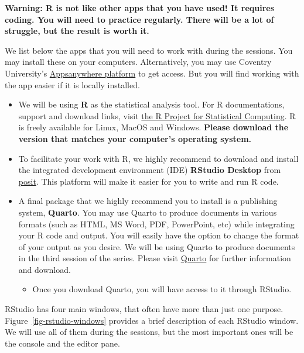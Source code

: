 \documentclass[
  letterpaper,
  DIV=11,
  numbers=noendperiod]{scrreprt}
\providecommand{\tightlist}{%
  \setlength{\itemsep}{0pt}\setlength{\parskip}{0pt}}\usepackage{longtable,booktabs,array}
\begin{document}
\textbf{Warning: R is not like other apps that you have used! It
requires coding. You will need to practice regularly. There will be a
lot of struggle, but the result is worth it.}

We list below the apps that you will need to work with during the
sessions. You may install these on your computers. Alternatively, you
may use Coventry University's
\href{https://appsanywhere.coventry.ac.uk/}{Appsanywhere platform} to
get access. But you will find working with the app easier if it is
locally installed.

\begin{itemize}
\item
  We will be using \textbf{R} as the statistical analysis tool. For R
  documentations, support and download links, visit
  \href{https://www.r-project.org/}{the R Project for Statistical
  Computing}. R is freely available for Linux, MacOS and Windows.
  \textbf{Please download the version that matches your computer's
  operating system.}
\item
  To facilitate your work with R, we highly recommend to download and
  install the integrated development environment (IDE) \textbf{RStudio
  Desktop} from \href{https://posit.co/downloads/}{posit}. This platform
  will make it easier for you to write and run R code.
\item
  A final package that we highly recommend you to install is a
  publishing system, \textbf{Quarto}. You may use Quarto to produce
  documents in various formats (such as HTML, MS Word, PDF, PowerPoint,
  etc) while integrating your R code and output. You will easily have
  the option to change the format of your output as you desire. We will
  be using Quarto to produce documents in the third session of the
  series. Please visit \href{https://quarto.org/}{Quarto} for further
  information and download.

  \begin{itemize}
  \tightlist
  \item
    Once you download Quarto, you will have access to it through
    RStudio.
  \end{itemize}
\end{itemize}

RStudio has four main windows, that often have more than just one
purpose. Figure~\ref{fig-rstudio-windows} provides a brief description
of each RStudio window. We will use all of them during the sessions, but
the most important ones will be the console and the editor pane.
\end{document}
